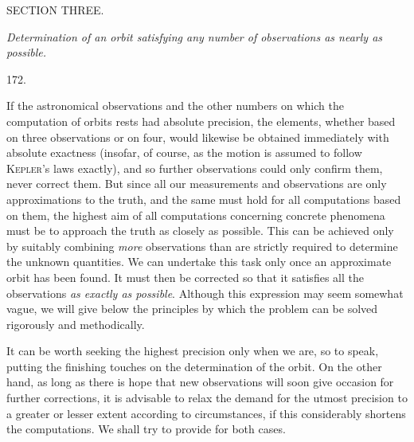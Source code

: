\clearpage
{}
\begin{center}
{\large SECTION THREE.}\par\medskip
\emph{Determination of an orbit satisfying any number of observations as nearly as possible.}\par\bigskip
\hypertarget{native-242-article172}{}172.
\end{center}
If the astronomical observations and the other numbers on which the computation of orbits rests had absolute precision, the elements, whether based on three observations or on four, would likewise be obtained immediately with absolute exactness (insofar, of course, as the motion is assumed to follow \textsc{Kepler}'s laws exactly), and so further observations could only confirm them, never correct them. But since all our measurements and observations are only approximations to the truth, and the same must hold for all computations based on them, the highest aim of all computations concerning concrete phenomena must be to approach the truth as closely as possible. This can be achieved only by suitably combining \emph{more} observations than are strictly required to determine the unknown quantities. We can undertake this task only once an approximate orbit has been found. It must then be corrected so that it satisfies all the observations \emph{as exactly as possible}. Although this expression may seem somewhat vague, we will give below the principles by which the problem can be solved rigorously and methodically.

It can be worth seeking the highest precision only when we are, so to speak, putting the finishing touches on the determination of the orbit. On the other hand, as long as there is hope that new observations will soon give occasion for further corrections, it is advisable to relax the demand for the utmost precision to a greater or lesser extent according to circumstances, if this considerably shortens the computations. We shall try to provide for both cases.
